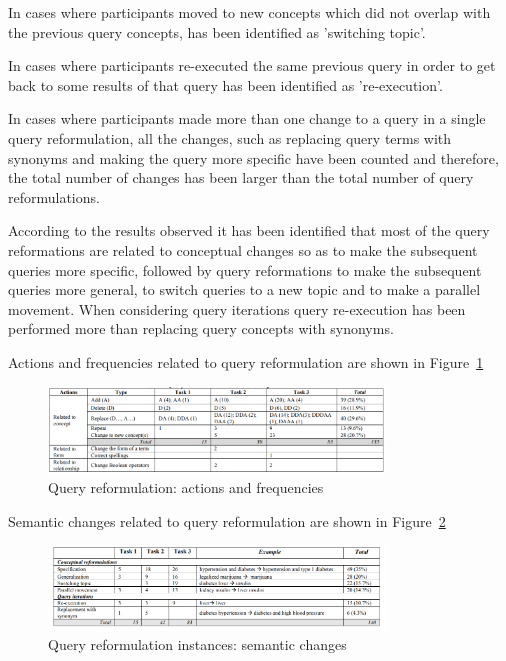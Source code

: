 \documentclass[]{article}
\begin{document}
In cases where participants moved to new concepts which did not overlap with the previous query concepts, has been identified as 'switching topic'. 

In cases where participants re-executed the same previous query in order to get back to some results of that query has been identified as 're-execution'. 

In cases where participants made more than one change to a query in a single query reformulation, all the changes, such as replacing query terms with synonyms and making the query more specific have been counted and therefore, the total number of changes has been larger than the total number of query reformulations.

According to the results observed it has been identified that most of the query reformations are related to conceptual changes so as to make the subsequent queries more specific, followed by query reformations to make the subsequent queries more general,  to switch queries to a new topic and to make a parallel movement. When considering query iterations query re-execution has been performed more than replacing query concepts with synonyms.

Actions and frequencies related to query reformulation are shown in Figure~\ref{fig18}

\begin{figure}[t!]
	\includegraphics[width=0.8\textwidth]{Capture18.png}
	\caption{ Query reformulation: actions and frequencies \label{fig18}}
\end{figure} 

Semantic changes related to query reformulation are shown in Figure~\ref{fig19}

\begin{figure}[b!]
	\includegraphics[width=0.8\textwidth]{Capture19.png}
	\caption{ Query reformulation instances: semantic changes \label{fig19}}
\end{figure}    
\end{document}
